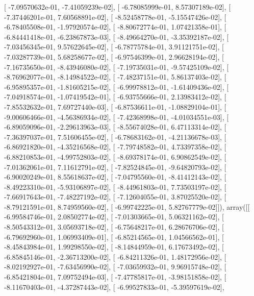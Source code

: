 \documentclass{article}
\begin{document}
       [ -7.09570632e-01,  -7.41059239e-02],
       [ -6.78085999e-01,   8.57307189e-02],
       [ -7.37446201e-01,   7.60568891e-02],
       [ -8.52458778e-01,  -5.15547426e-02],
       [ -6.78405508e-01,  -1.97920574e-02],
       [ -8.80672774e-01,   1.07421358e-01],
       [ -6.84441418e-01,  -6.23867873e-03],
       [ -8.49664270e-01,  -3.35392187e-02],
       [ -7.03456345e-01,   9.57622645e-02],
       [ -6.78775784e-01,   3.91121751e-02],
       [ -7.03287739e-01,   5.68258677e-02],
       [ -6.97546399e-01,   2.96628194e-02],
       [ -7.16735650e-01,  -8.43946080e-02],
       [ -7.19735031e-01,  -9.57425109e-02],
       [ -8.76962077e-01,  -8.14984522e-02],
       [ -7.48237151e-01,   5.86137403e-02],
       [ -6.95895357e-01,  -1.81605215e-02],
       [ -6.99978812e-01,  -1.61409436e-02],
       [ -7.04918574e-01,  -1.07419542e-01],
       [ -6.93755666e-01,   2.13983412e-02],
       [ -7.85532632e-01,   7.69727440e-03],
       [ -6.87536611e-01,  -1.08829104e-01],
       [ -9.00606466e-01,  -4.56386934e-02],
       [ -7.42368998e-01,  -4.01034551e-03],
       [ -6.89059096e-01,  -2.29613963e-03],
       [ -8.55674028e-01,   6.47113314e-02],
       [ -7.36397037e-01,   7.51606455e-02],
       [ -6.78683162e-01,  -4.21136678e-03],
       [ -6.86921820e-01,  -4.35216568e-02],
       [ -7.79748582e-01,   4.73397358e-02],
       [ -6.88210853e-01,  -4.99752803e-02],
       [ -8.69378174e-01,   6.90862549e-02],
       [ -7.01362061e-01,   7.11612791e-02],
       [ -7.82524845e-01,  -9.64820793e-02],
       [ -6.90020249e-01,   8.55618637e-02],
       [ -7.04795560e-01,  -8.41412143e-02],
       [ -8.49223310e-01,  -5.93106897e-02],
       [ -8.44961803e-01,   7.73503197e-02],
       [ -7.66917643e-01,  -7.48227192e-02],
       [ -7.12604055e-01,   3.87025520e-02],
       [ -8.79121591e-01,   8.74959560e-02],
       [ -6.99742225e-01,   5.82767779e-02]]), array([[ -6.99584746e-01,   2.08502774e-02],
       [ -7.01303665e-01,   5.06321162e-02],
       [ -8.50543312e-01,   3.05693718e-02],
       [ -6.75648217e-01,   6.28676706e-02],
       [ -6.79692960e-01,   1.06993409e-01],
       [ -6.85214565e-01,   1.04566562e-01],
       [ -8.45843984e-01,   1.99298550e-02],
       [ -8.14844959e-01,   6.17673492e-02],
       [ -6.85845146e-01,  -2.36713200e-02],
       [ -6.84211326e-01,   1.48172956e-02],
       [ -8.02192927e-01,  -7.63456990e-02],
       [ -7.03659932e-01,   9.96915748e-02],
       [ -6.85421804e-01,   7.09752494e-03],
       [ -7.47785817e-01,  -3.98151858e-02],
       [ -8.11670403e-01,  -4.37287443e-02],
       [ -6.99527833e-01,  -5.39597619e-02],
\end{document}
